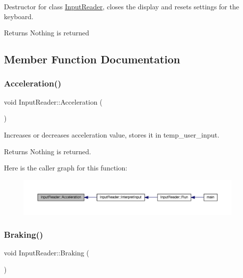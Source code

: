 Destructor for class \hyperlink{classInputReader}{Input\+Reader}, closes the display and resets settings for the keyboard. \begin{DoxyReturn}{Returns}
Nothing is returned 
\end{DoxyReturn}


\subsection{Member Function Documentation}
\mbox{\label{classInputReader_a0740495343639fcf0759a1b8fe0fe2e0}} 
\subsubsection{\texorpdfstring{Acceleration()}{Acceleration()}}
{\footnotesize\ttfamily void Input\+Reader\+::\+Acceleration (\begin{DoxyParamCaption}{ }\end{DoxyParamCaption})}

Increases or decreases acceleration value, stores it in temp\+\_\+user\+\_\+input. \begin{DoxyReturn}{Returns}
Nothing is returned. 
\end{DoxyReturn}
Here is the caller graph for this function\+:
\nopagebreak
\begin{figure}[H]
\begin{center}
\leavevmode
\includegraphics[width=350pt]{classInputReader_a0740495343639fcf0759a1b8fe0fe2e0_icgraph}
\end{center}
\end{figure}
\mbox{\label{classInputReader_ad35d36c2bac3f4b6bae2d2ad501873cb}} 
\subsubsection{\texorpdfstring{Braking()}{Braking()}}
{\footnotesize\ttfamily void Input\+Reader\+::\+Braking (\begin{DoxyParamCaption}{ }\end{DoxyParamCaption})}

